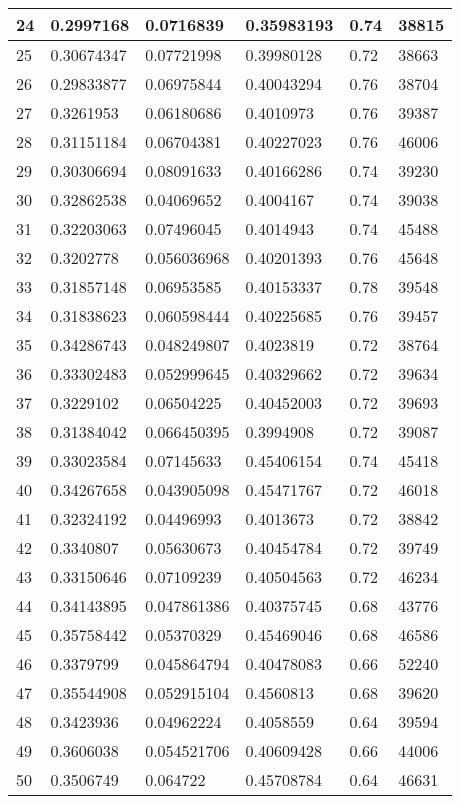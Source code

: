 \begin{longtable}{|l|l|l|l|l|l|}
24 & 0.2997168 & 0.0716839 & 0.35983193 & 0.74 & 38815 \\ \hline 
25 & 0.30674347 & 0.07721998 & 0.39980128 & 0.72 & 38663 \\ \hline 
26 & 0.29833877 & 0.06975844 & 0.40043294 & 0.76 & 38704 \\ \hline 
27 & 0.3261953 & 0.06180686 & 0.4010973 & 0.76 & 39387 \\ \hline 
28 & 0.31151184 & 0.06704381 & 0.40227023 & 0.76 & 46006 \\ \hline 
29 & 0.30306694 & 0.08091633 & 0.40166286 & 0.74 & 39230 \\ \hline 
30 & 0.32862538 & 0.04069652 & 0.4004167 & 0.74 & 39038 \\ \hline 
31 & 0.32203063 & 0.07496045 & 0.4014943 & 0.74 & 45488 \\ \hline 
32 & 0.3202778 & 0.056036968 & 0.40201393 & 0.76 & 45648 \\ \hline 
33 & 0.31857148 & 0.06953585 & 0.40153337 & 0.78 & 39548 \\ \hline 
34 & 0.31838623 & 0.060598444 & 0.40225685 & 0.76 & 39457 \\ \hline 
35 & 0.34286743 & 0.048249807 & 0.4023819 & 0.72 & 38764 \\ \hline 
36 & 0.33302483 & 0.052999645 & 0.40329662 & 0.72 & 39634 \\ \hline 
37 & 0.3229102 & 0.06504225 & 0.40452003 & 0.72 & 39693 \\ \hline 
38 & 0.31384042 & 0.066450395 & 0.3994908 & 0.72 & 39087 \\ \hline 
39 & 0.33023584 & 0.07145633 & 0.45406154 & 0.74 & 45418 \\ \hline 
40 & 0.34267658 & 0.043905098 & 0.45471767 & 0.72 & 46018 \\ \hline 
41 & 0.32324192 & 0.04496993 & 0.4013673 & 0.72 & 38842 \\ \hline 
42 & 0.3340807 & 0.05630673 & 0.40454784 & 0.72 & 39749 \\ \hline 
43 & 0.33150646 & 0.07109239 & 0.40504563 & 0.72 & 46234 \\ \hline 
44 & 0.34143895 & 0.047861386 & 0.40375745 & 0.68 & 43776 \\ \hline 
45 & 0.35758442 & 0.05370329 & 0.45469046 & 0.68 & 46586 \\ \hline 
46 & 0.3379799 & 0.045864794 & 0.40478083 & 0.66 & 52240 \\ \hline 
47 & 0.35544908 & 0.052915104 & 0.4560813 & 0.68 & 39620 \\ \hline 
48 & 0.3423936 & 0.04962224 & 0.4058559 & 0.64 & 39594 \\ \hline 
49 & 0.3606038 & 0.054521706 & 0.40609428 & 0.66 & 44006 \\ \hline 
50 & 0.3506749 & 0.064722 & 0.45708784 & 0.64 & 46631 \\ \hline 
\end{longtable}